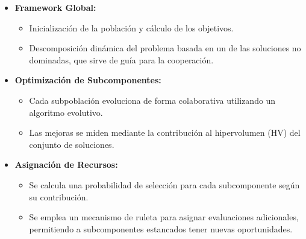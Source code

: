 \begin{frame}{\parencite{Guo_2024_CCDF} }{}
    \begin{itemize}
        \item \textbf{Framework Global:}
              \begin{itemize}
                  \item Inicialización de la población y cálculo de los objetivos.
                  \item Descomposición dinámica del problema basada en un  de las soluciones no dominadas, que sirve de guía para la cooperación.
              \end{itemize}
        \item \textbf{Optimización de Subcomponentes:}
              \begin{itemize}
                  \item Cada subpoblación evoluciona de forma colaborativa utilizando un algoritmo evolutivo.
                  \item Las mejoras se miden mediante la contribución al hipervolumen (HV) del conjunto de soluciones.
              \end{itemize}
        \item \textbf{Asignación de Recursos:}
              \begin{itemize}
                  \item Se calcula una probabilidad de selección para cada subcomponente según su contribución.
                  \item Se emplea un mecanismo de ruleta para asignar evaluaciones adicionales, permitiendo a subcomponentes estancados tener nuevas oportunidades.
              \end{itemize}
    \end{itemize}
\end{frame}


